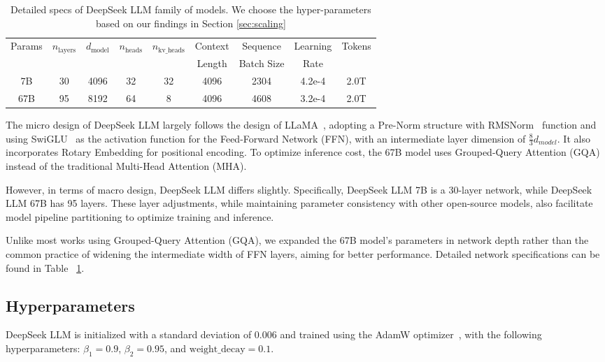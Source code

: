 \documentclass[11pt, a4paper, logo, copyright, nonumbering]{deepseek}
\begin{document}
\begin{CJK*}{UTF8}{gbsn}
\begin{table}[hb]
    \centering
    \begin{tabular}{ccccccccc}
    \toprule
        \multirow{2}{*}{Params} & \multirow{2}{*}{$n_{\mathrm{layers}}$} & \multirow{2}{*}{$d_{\mathrm{model}}$} & \multirow{2}{*}{$n_{\mathrm{heads}}$} & \multirow{2}{*}{$n_{\mathrm{kv\_heads}}$} & Context & Sequence & Learning & \multirow{2}{*}{Tokens} \\
         & & & & & Length & Batch Size & Rate & \\
    \midrule
        7B  & 30 & 4096 & 32 & 32 & 4096 & 2304 & 4.2e-4 & 2.0T \\
        67B & 95 & 8192 & 64 & 8  & 4096 & 4608 & 3.2e-4 & 2.0T \\
    \bottomrule
    \end{tabular}
    \caption{Detailed specs of DeepSeek LLM family of models. We choose the hyper-parameters based on our findings in Section \ref{sec:scaling}}
    \label{tab:architecture}
\end{table}

The micro design of DeepSeek LLM largely follows the design of LLaMA~\citep{llama, llama2}, adopting a Pre-Norm structure with RMSNorm~\citep{zhang2019root} function and using SwiGLU~\citep{shazeer2020glu} as the activation function for the Feed-Forward Network (FFN), with an intermediate layer dimension of $\frac{8}{3}d_{model}$. It also incorporates Rotary Embedding \citep{su2024roformer} for positional encoding. To optimize inference cost, the 67B model uses Grouped-Query Attention (GQA) \citep{ainslie2023gqa} instead of the traditional Multi-Head Attention (MHA).

However, in terms of macro design, DeepSeek LLM differs slightly. Specifically, DeepSeek LLM 7B is a 30-layer network, while DeepSeek LLM 67B has 95 layers. These layer adjustments, while maintaining parameter consistency with other open-source models, also facilitate model pipeline partitioning to optimize training and inference.

Unlike most works using Grouped-Query Attention (GQA), we expanded the 67B model's parameters in network depth rather than the common practice of widening the intermediate width of FFN layers, aiming for better performance. Detailed network specifications can be found in Table ~\ref{tab:architecture}.

\subsection{Hyperparameters}
\label{sec:intro-hyper-params}
DeepSeek LLM is initialized with a standard deviation of 0.006 and trained using the AdamW optimizer~\citep{adamW}, with the following hyperparameters: $\beta_1=0.9$, $\beta_2=0.95$, and $\mathrm{weight\_decay}=0.1$.


\end{CJK*}
\end{document}
